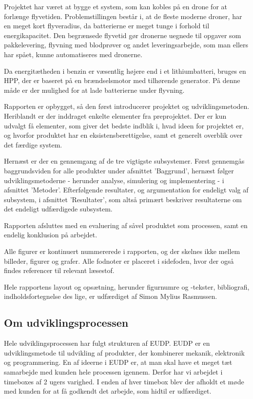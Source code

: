 Projektet har været at bygge et system, som kan kobles på en drone for at forlænge flyvetiden. Problemstillingen består i, at de fleste moderne droner, har en meget kort flyveradius, da batterierne er meget tunge i forhold til energikapacitet. Den begrænsede flyvetid gør dronerne uegnede til opgaver som pakkelevering, flyvning med blodprøver og andet leveringsarbejde, som man ellers har spået, kunne automatiseres med dronerne.

Da energitætheden i benzin er væsentlig højere end i et lithiumbatteri, bruges en HPP, der er baseret på en brændselsmotor med tilhørende generator. På denne måde er der  mulighed for at lade batterierne under flyvning.

Rapporten er opbygget, så den først introducerer projektet og udviklingsmetoden. Heriblandt er der inddraget enkelte elementer fra preprojektet. Der er kun udvalgt få elementer, som giver det bedste indblik i, hvad ideen for projektet er, og hvorfor produktet har en eksistensberettigelse, samt et generelt overblik over det færdige system. 

Hernæst er der en gennemgang af de tre vigtigste subsystemer. Først gennemgås baggrundsviden for alle produkter under afsnittet ’Baggrund’, hernæst følger udviklingsmetoderne - herunder analyse, simulering og implementering - i afsnittet ’Metoder’. Efterfølgende resultater, og argumentation for endeligt valg af subsystem, i afsnittet ’Resultater’, som altså primært beskriver resultaterne om det endeligt udfærdigede subsystem. 

Rapporten afsluttes med en evaluering af såvel produktet som processen, samt en endelig konklusion på arbejdet. 

Alle figurer er kontinuert nummererede i rapporten, og der skelnes ikke mellem billeder, figurer og grafer. Alle fodnoter er placeret i sidefoden, hvor der også findes referencer til relevant læsestof.%

Hele rapportens layout og opsætning, herunder figurnumre og -tekster, bibliografi, indholdsfortegnelse des lige, er udfærdiget af Simon Mylius Rasmussen.

\subsection{Om udviklingsprocessen}
\label{sec:om-udvikl}

Hele udviklingsprocessen har fulgt strukturen af EUDP. EUDP er en udviklingsmetode til udvikling af produkter, der kombinerer mekanik, elektronik og programmering. En af ideerne i EUDP er, at man skal have et meget tæt samarbejde med kunden hele processen igennem. Derfor har vi arbejdet i timeboxes af 2 ugers varighed. I enden af hver timebox blev der afholdt et møde med kunden for at få godkendt det arbejde, som hidtil er udfærdiget. 

